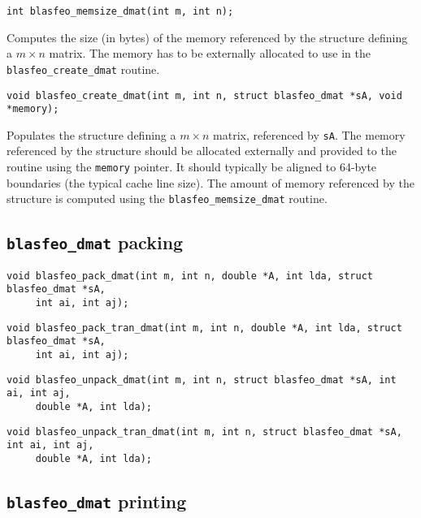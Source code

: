 \documentclass[a4paper]{report}
\begin{document}
\begin{verbatim}
int blasfeo_memsize_dmat(int m, int n);
\end{verbatim}
Computes the size (in bytes) of the memory referenced by the structure defining a $m\times n$ matrix.
The memory has to be externally allocated to use in the {\tt blasfeo\_create\_dmat} routine.

\begin{verbatim}
void blasfeo_create_dmat(int m, int n, struct blasfeo_dmat *sA, void *memory);
\end{verbatim}
Populates the structure defining a $m\times n$ matrix, referenced by {\tt sA}.
The memory referenced by the structure should be allocated externally and provided to the routine using the {\tt memory} pointer.
It should typically be aligned to 64-byte boundaries (the typical cache line size).
The amount of memory referenced by the structure is computed using the {\tt blasfeo\_memsize\_dmat} routine.



\subsection{{\tt blasfeo\_dmat} packing}

\begin{verbatim}
void blasfeo_pack_dmat(int m, int n, double *A, int lda, struct blasfeo_dmat *sA, 
     int ai, int aj);
\end{verbatim}

\begin{verbatim}
void blasfeo_pack_tran_dmat(int m, int n, double *A, int lda, struct blasfeo_dmat *sA, 
     int ai, int aj);
\end{verbatim}

\begin{verbatim}
void blasfeo_unpack_dmat(int m, int n, struct blasfeo_dmat *sA, int ai, int aj, 
     double *A, int lda);
\end{verbatim}

\begin{verbatim}
void blasfeo_unpack_tran_dmat(int m, int n, struct blasfeo_dmat *sA, int ai, int aj, 
     double *A, int lda);
\end{verbatim}



\subsection{{\tt blasfeo\_dmat} printing}
\end{document}

